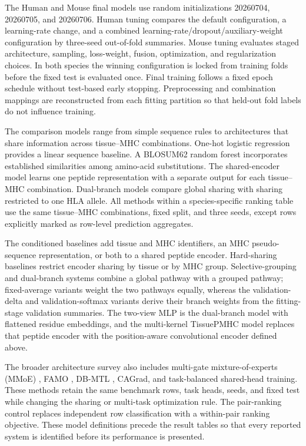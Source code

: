 The Human and Mouse final models use random initializations 20260704, 20260705, and 20260706. Human tuning compares the default configuration, a learning-rate change, and a combined learning-rate/dropout/auxiliary-weight configuration by three-seed out-of-fold summaries. Mouse tuning evaluates staged architecture, sampling, loss-weight, fusion, optimization, and regularization choices. In both species the winning configuration is locked from training folds before the fixed test is evaluated once. Final training follows a fixed epoch schedule without test-based early stopping. Preprocessing and combination mappings are reconstructed from each fitting partition so that held-out fold labels do not influence training.

The comparison models range from simple sequence rules to architectures that share information across tissue--MHC combinations. One-hot logistic regression provides a linear sequence baseline. A BLOSUM62 random forest incorporates established similarities among amino-acid substitutions. The shared-encoder model learns one peptide representation with a separate output for each tissue--MHC combination. Dual-branch models compare global sharing with sharing restricted to one HLA allele. All methods within a species-specific ranking table use the same tissue--MHC combinations, fixed split, and three seeds, except rows explicitly marked as row-level prediction aggregates.

The conditioned baselines add tissue and MHC identifiers, an MHC pseudo-sequence representation, or both to a shared peptide encoder. Hard-sharing baselines restrict encoder sharing by tissue or by MHC group. Selective-grouping and dual-branch systems combine a global pathway with a grouped pathway; fixed-average variants weight the two pathways equally, whereas the validation-delta and validation-softmax variants derive their branch weights from the fitting-stage validation summaries. The two-view MLP is the dual-branch model with flattened residue embeddings, and the multi-kernel TissuePMHC model replaces that peptide encoder with the position-aware convolutional encoder defined above.

The broader architecture survey also includes multi-gate mixture-of-experts (MMoE) \cite{ma2018mmoe}, FAMO \cite{liu2023famo}, DB-MTL \cite{lin2023dbmtl}, CAGrad, and task-balanced shared-head training. These methods retain the same benchmark rows, task heads, seeds, and fixed test while changing the sharing or multi-task optimization rule. The pair-ranking control replaces independent row classification with a within-pair ranking objective. These model definitions precede the result tables so that every reported system is identified before its performance is presented.

